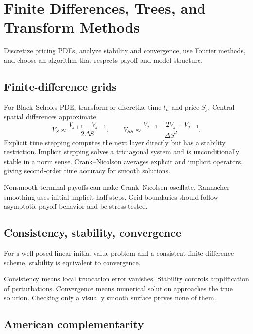 \chapter{Finite Differences, Trees, and Transform Methods}

\begin{objectives}
Discretize pricing PDEs, analyze stability and convergence, use Fourier methods, and
choose an algorithm that respects payoff and model structure.
\end{objectives}

\section{Finite-difference grids}

For Black--Scholes PDE, transform or discretize time $t_n$ and price $S_j$. Central
spatial differences approximate
\[
V_S\approx\frac{V_{j+1}-V_{j-1}}{2\Delta S},\qquad
V_{SS}\approx\frac{V_{j+1}-2V_j+V_{j-1}}{\Delta S^2}.
\]
Explicit time stepping computes the next layer directly but has a stability
restriction. Implicit stepping solves a tridiagonal system and is unconditionally
stable in a norm sense. Crank--Nicolson averages explicit and implicit operators,
giving second-order time accuracy for smooth solutions.

Nonsmooth terminal payoffs can make Crank--Nicolson oscillate. Rannacher smoothing
uses initial implicit half steps. Grid boundaries should follow asymptotic payoff
behavior and be stress-tested.

\section{Consistency, stability, convergence}

\begin{theorem}
For a well-posed linear initial-value problem and a consistent finite-difference
scheme, stability is equivalent to convergence.
\end{theorem}

Consistency means local truncation error vanishes. Stability controls amplification
of perturbations. Convergence means numerical solution approaches the true solution.
Checking only a visually smooth surface proves none of them.

\section{American complementarity}

